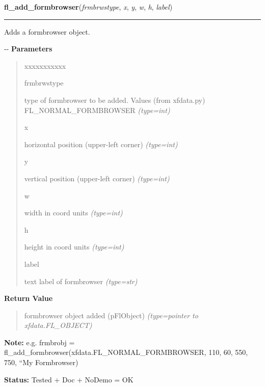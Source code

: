 \hspace{.8\funcindent}\begin{boxedminipage}{\funcwidth}

    \raggedright \textbf{fl\_add\_formbrowser}(\textit{frmbrwstype}, \textit{x}, \textit{y}, \textit{w}, \textit{h}, \textit{label})

    \vspace{-1.5ex}

    \rule{\textwidth}{0.5\fboxrule}
\setlength{\parskip}{2ex}

Adds a formbrowser object.

-{}-
\setlength{\parskip}{1ex}
      \textbf{Parameters}
      \vspace{-1ex}

      \begin{quote}
        \begin{Ventry}{xxxxxxxxxxx}

          \item[frmbrwstype]


type of formbrowser to be added. Values (from xfdata.py)
FL\_NORMAL\_FORMBROWSER
            {\it (type=int)}

          \item[x]


horizontal position (upper-left corner)
            {\it (type=int)}

          \item[y]


vertical position (upper-left corner)
            {\it (type=int)}

          \item[w]


width in coord units
            {\it (type=int)}

          \item[h]


height in coord units
            {\it (type=int)}

          \item[label]


text label of formbrowser
            {\it (type=str)}

        \end{Ventry}

      \end{quote}

      \textbf{Return Value}
    \vspace{-1ex}

      \begin{quote}

formbrowser object added (pFlObject)
      {\it (type=pointer to xfdata.FL\_OBJECT)}

      \end{quote}

\textbf{Note:} 
e.g. frmbrobj = fl\_add\_formbrowser(xfdata.FL\_NORMAL\_FORMBROWSER,
110, 60, 550, 750, ``My Formbrowser)


\textbf{Status:} 
Tested + Doc + NoDemo = OK


    \end{boxedminipage}

